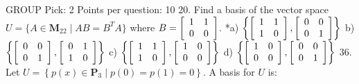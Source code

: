 GROUP
Pick: 2
Points per question: 10
20. Find a basis of the vector space %
    $U=\{A\in\mathbf{M}_{22}\mid AB=B^{T}A\}$ where $B=\left[
    \begin{array}[c]{cc}
	1 &  1\\
	0 &  0
    \end{array}
    \right]$.
*a) $\left\{\left[
    \begin{array}[c]{cc}
	1 &  1\\
	1 &  0
    \end{array}
    \right],\left[
    \begin{array}[c]{cc}
	0 &  0\\
	0 &  1
    \end{array}
    \right]  \right\}$
b)  $\left\{\left[
    \begin{array}[c]{cc}
	0 &  0\\
	0 &  1
    \end{array}
    \right],\left[
    \begin{array}[c]{cc}
	0 &  1\\
	1 &  0
    \end{array}
    \right]  \right\}$
c)  $\left\{\left[
    \begin{array}[c]{cc}
	1 &  1\\
	1 &  0
    \end{array}
    \right],\left[
    \begin{array}[c]{cc}
	1 &  0\\
	0 &  0
    \end{array}
    \right]  \right\}$
d)  $\left\{\left[
    \begin{array}[c]{cc}
	1 &  0\\
	0 &  0
    \end{array}
    \right],\left[
    \begin{array}[c]{cc}
	0 &  0\\
	0 &  1
    \end{array}
    \right]  \right\}$
36. Let $U=\left\{  p(x)\in\mathbf{P}_{3}\mid p(0)=p(1)=0\right\}$. A basis for $U$ is: %
